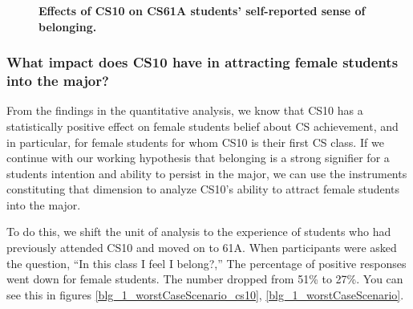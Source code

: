 \documentclass[oneside,titlepage,numbers=noenddot,headinclude,%
               footinclude=true,cleardoublepage=empty,abstractoff,BCOR=2mm,%
               paper=a4,fontsize=11pt,ngerman,american]{scrreprt}
\numberwithin{theorem}{chapter}
\numberwithin{definition}{chapter}
\numberwithin{algorithm}{chapter}
\numberwithin{figure}{chapter}
\numberwithin{table}{chapter}
\numberwithin{equation}{chapter}
\begin{document}
\begin{figure}[!htbp]
    \centering
  
%
\caption{\textbf{Effects of CS10 on CS61A students' self-reported sense of belonging.}}
\label{fig:blg_1_cs10_cs61a}
\end{figure}



\subsubsection *{What impact does CS10 have in attracting female students into the major?}

From the findings in the quantitative analysis, we know that CS10 has a statistically positive effect on female students belief about CS achievement, and in particular, for female students for whom CS10 is their first CS class. If we continue with our working hypothesis that belonging is a strong signifier for a students intention and ability to persist in the major, we can use the instruments constituting that dimension to analyze CS10's ability to attract female students into the major.

To do this, we shift the unit of analysis to the experience of students who had previously attended CS10 and moved on to 61A. When participants were asked the question, ``In this class I feel I belong?,'' The percentage of positive responses went down for female students. The number dropped from 51\% to 27\%. You can see this in figures \ref{blg_1_worstCaseScenario_cs10}, \ref{blg_1_worstCaseScenario}. 
\end{document}
